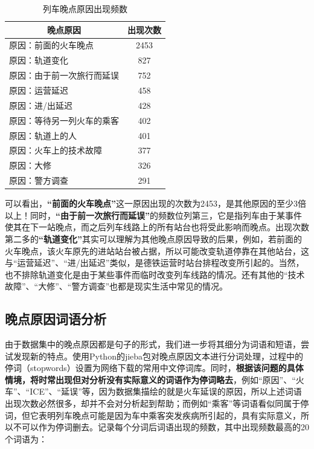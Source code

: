 \documentclass[lang=cn,12pt,a4paper,cite=authoryear]{elegantpaper}
\begin{document}
\begin{table}[H]
	\centering
	\caption{列车晚点原因出现频数}
	\label{tab2}
	\begin{tabular}{@{}lc@{}}
		\toprule
		\multicolumn{1}{c}{晚点原因} & 出现次数 \\ \midrule
		原因：前面的火车晚点               & 2453 \\
		原因：轨道变化                  & 827  \\
		原因：由于前一次旅行而延误            & 752  \\
		原因：运营延迟                  & 458  \\
		原因：进/出延迟                 & 428  \\
		原因：等待另一列火车的乘客            & 402  \\
		原因：轨道上的人                 & 401  \\
		原因：火车上的技术故障              & 377  \\
		原因：大修                    & 326  \\
		原因：警方调查                  & 291  \\ \bottomrule
	\end{tabular}
\end{table}

可以看出，\textbf{“前面的火车晚点”}这一原因出现的次数为2453，是其他原因的至少3倍以上！同时，\textbf{“由于前一次旅行而延误”}的频数位列第三，它是指列车由于某事件使其在下一站晚点，而之后列车线路上的所有站台也将受此影响而晚点。出现次数第二多的\textbf{“轨道变化”}其实可以理解为其他晚点原因导致的后果，例如，若前面的火车晚点，该火车原先的进站站台被占据，所以可能改变轨道停靠在其他站台，这与“运营延迟”、“进/出延迟”类似，是德铁运营时站台排程改变所引起的。当然，也不排除轨道变化是由于某些事件而临时改变列车线路的情况。还有其他的“技术故障”、“大修”、“警方调查”也都是现实生活中常见的情况。

\subsection{晚点原因词语分析}

由于数据集中的晚点原因都是句子的形式，我们进一步将其细分为词语和短语，尝试发现新的特点。使用Python的jieba包对晚点原因文本进行分词处理，过程中的停词（stopwords）设置为网络下载的常用中文停词库。同时，\textbf{根据该问题的具体情境，将时常出现但对分析没有实际意义的词语作为停词略去}，例如“原因”、“火车”、“ICE”、“延误”等，因为数据集描绘的就是火车延误的原因，所以上述词语出现次数必然很多，却并不会对分析起到帮助；而例如“乘客”等词语看似同属于停词，但它表明列车晚点可能是因为车中乘客突发疾病所引起的，具有实际意义，所以不可以作为停词删去。记录每个分词后词语出现的频数，其中出现频数最高的20个词语为：
\end{document}
